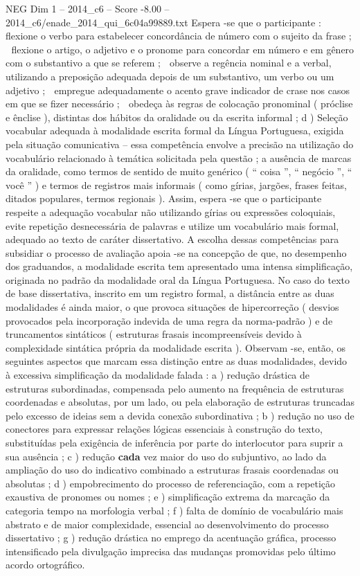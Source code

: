 \begin{textsample}{NEG Dim 1 – 2014\_c6 – Score -8.00 – 2014\_c6/enade\_2014\_qui\_6c04a99889.txt}
Espera -se que o participante :  flexione o verbo para estabelecer concordância de número com o sujeito da frase ;  flexione o artigo, o adjetivo e o pronome para concordar em número e em gênero com o substantivo a que se referem ;  observe a regência nominal e a verbal, utilizando a preposição adequada depois de um substantivo, um verbo ou um adjetivo ;  empregue adequadamente o acento grave indicador de crase nos casos em que se fizer necessário ;  obedeça às regras de colocação pronominal ( próclise e ênclise ), distintas dos hábitos da oralidade ou da escrita informal ; d ) Seleção vocabular adequada à modalidade escrita formal da Língua Portuguesa, exigida pela situação comunicativa – essa competência envolve a precisão na utilização do vocabulário relacionado à temática solicitada pela questão ; a ausência de marcas da oralidade, como termos de sentido de muito genérico ( “ coisa ”, “ negócio ”, “ você ” ) e termos de registros mais informais ( como gírias, jargões, frases feitas, ditados populares, termos regionais ).
Assim, espera -se que o participante respeite a adequação vocabular não utilizando gírias ou expressões coloquiais, evite repetição desnecessária de palavras e utilize um vocabulário mais formal, adequado ao texto de caráter dissertativo.
A escolha dessas competências para subsidiar o processo de avaliação apoia -se na concepção de que, no desempenho dos graduandos, a modalidade escrita tem apresentado uma intensa simplificação, originada no padrão da modalidade oral da Língua Portuguesa.
No caso do texto de base dissertativa, inscrito em um registro formal, a distância entre as duas modalidades é ainda maior, o que provoca situações de hipercorreção ( desvios provocados pela incorporação indevida de uma regra da norma-padrão ) e de truncamentos sintáticos ( estruturas frasais incompreensíveis devido à complexidade sintática própria da modalidade escrita ).
Observam -se, então, os seguintes aspectos que marcam essa distinção entre as duas modalidades, devido à excessiva simplificação da modalidade falada : a ) redução drástica de estruturas subordinadas, compensada pelo aumento na frequência de estruturas coordenadas e absolutas, por um lado, ou pela elaboração de estruturas truncadas pelo excesso de ideias sem a devida conexão subordinativa ; b ) redução no uso de conectores para expressar relações lógicas essenciais à construção do texto, substituídas pela exigência de inferência por parte do interlocutor para suprir a sua ausência ; c ) redução \textbf{cada} vez maior do uso do subjuntivo, ao lado da ampliação do uso do indicativo combinado a estruturas frasais coordenadas ou absolutas ; d ) empobrecimento do processo de referenciação, com a repetição exaustiva de pronomes ou nomes ; e ) simplificação extrema da marcação da categoria tempo na morfologia verbal ; f ) falta de domínio de vocabulário mais abstrato e de maior complexidade, essencial ao desenvolvimento do processo dissertativo ; g ) redução drástica no emprego da acentuação gráfica, processo intensificado pela divulgação imprecisa das mudanças promovidas pelo último acordo ortográfico.

\end{textsample}
